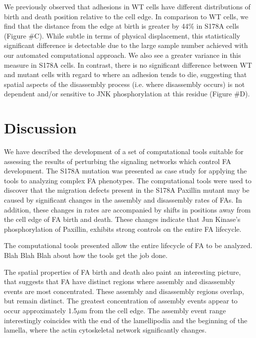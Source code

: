 \documentclass[10pt]{article}
\begin{document}
We previously observed that adhesions in WT cells have different distributions
of birth and death position relative to the cell edge. In comparison to WT
cells, we find that the distance from the edge at birth is greater by 44\% in
S178A cells (Figure \#C). While subtle in terms of physical displacement, this
statistically significant difference is detectable due to the large sample
number achieved with our automated computational approach. We also see a greater
variance in this measure in S178A cells. In contrast, there is no significant
difference between WT and mutant cells with regard to where an adhesion tends to
die, suggesting that spatial aspects of the disassembly process (i.e. where
disassembly occurs) is not dependent and/or sensitive to JNK phosphorylation at
this residue (Figure \#D).



\section*{Discussion}

We have described the development of a set of computational tools suitable for
assessing the results of perturbing the signaling networks which control FA
development. The S178A mutation was presented as case study for applying the
tools to analyzing complex FA phenotypes. The computational tools were used to
discover that the migration defects present in the S178A Paxillin mutant may be
caused by significant changes in the assembly and disassembly rates of FAs. In
addition, these changes in rates are accompanied by shifts in positions away
from the cell edge of FA birth and death. These changes indicate that Jun
Kinase's phosphorylation of Paxillin, exhibits strong controls on the entire FA
lifecycle.

The computational tools presented allow the entire lifecycle of FA to be
analyzed. Blah Blah Blah about how the tools get the job done.

The spatial properties of FA birth and death also paint an interesting picture,
that suggests that FA have distinct regions where assembly and disassembly
events are most concentrated. These assembly and disassembly regions overlap,
but remain distinct. The greatest concentration of assembly events appear to
occur approximately 1.5$\mu$m from the cell edge. The assembly event range
interestingly coincides with the end of the lamellipodia and the beginning of
the lamella, where the actin cytoskeletal network significantly changes. 
\end{document}
